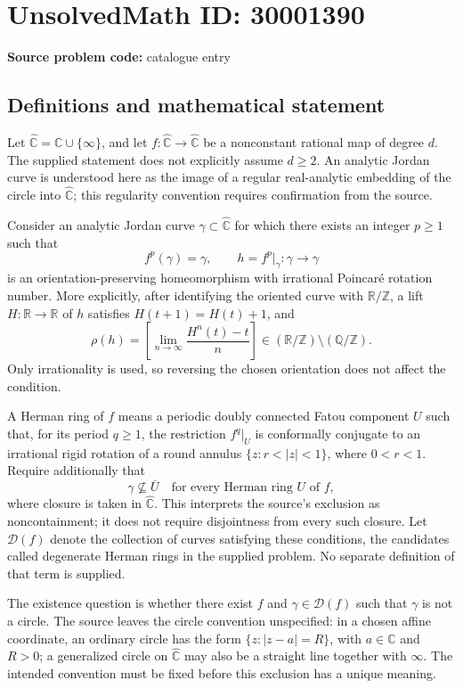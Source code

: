 \documentclass[11pt]{article}
\newcommand{\Z}{\mathbb{Z}}
\newcommand{\Q}{\mathbb{Q}}
\newcommand{\R}{\mathbb{R}}
\newcommand{\C}{\mathbb{C}}
\begin{document}
\section*{UnsolvedMath ID: 30001390}
\textbf{Source problem code:} catalogue entry
\subsection{Definitions and mathematical statement}
Let \(\widehat{\C}=\C\cup\{\infty\}\), and let \(f:\widehat{\C}\to\widehat{\C}\) be a nonconstant rational map of degree \(d\). The supplied statement does not explicitly assume \(d\geq 2\). An analytic Jordan curve is understood here as the image of a regular real-analytic embedding of the circle into \(\widehat{\C}\); this regularity convention requires confirmation from the source.

Consider an analytic Jordan curve \(\gamma\subset\widehat{\C}\) for which there exists an integer \(p\geq 1\) such that
\[
f^p(\gamma)=\gamma,
\qquad h=f^p|_\gamma:\gamma\to\gamma
\]
is an orientation-preserving homeomorphism with irrational Poincar\'e rotation number. More explicitly, after identifying the oriented curve with \(\R/\Z\), a lift \(H:\R\to\R\) of \(h\) satisfies \(H(t+1)=H(t)+1\), and
\[
\rho(h)=\left[\lim_{n\to\infty}\frac{H^n(t)-t}{n}\right]\in(\R/\Z)\setminus(\Q/\Z).
\]
Only irrationality is used, so reversing the chosen orientation does not affect the condition.

A Herman ring of \(f\) means a periodic doubly connected Fatou component \(U\) such that, for its period \(q\geq 1\), the restriction \(f^q|_U\) is conformally conjugate to an irrational rigid rotation of a round annulus \(\{z:r<|z|<1\}\), where \(0<r<1\). Require additionally that
\[
\gamma\not\subseteq\overline U
\quad\text{for every Herman ring }U\text{ of }f,
\]
where closure is taken in \(\widehat{\C}\). This interprets the source's exclusion as noncontainment; it does not require disjointness from every such closure. Let \(\mathcal D(f)\) denote the collection of curves satisfying these conditions, the candidates called degenerate Herman rings in the supplied problem. No separate definition of that term is supplied.

The existence question is whether there exist \(f\) and \(\gamma\in\mathcal D(f)\) such that \(\gamma\) is not a circle. The source leaves the circle convention unspecified: in a chosen affine coordinate, an ordinary circle has the form \(\{z:|z-a|=R\}\), with \(a\in\C\) and \(R>0\); a generalized circle on \(\widehat{\C}\) may also be a straight line together with \(\infty\). The intended convention must be fixed before this exclusion has a unique meaning.
\end{document}
